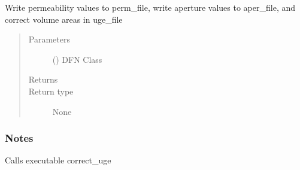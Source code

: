 \documentclass[letterpaper,10pt,english]{sphinxmanual}
\begin{document}
\begin{fulllineitems}
\label{\detokenize{pydfnworks:pydfnworks.dfnFlow.pflotran.write_perms_and_correct_volumes_areas}}
Write permeability values to perm\_file, write aperture values to aper\_file, and correct volume areas in uge\_file
\begin{quote}\begin{description}
\item[{Parameters}] \leavevmode
{} () \textendash{} DFN Class

\item[{Returns}] \leavevmode


\item[{Return type}] \leavevmode
None

\end{description}\end{quote}
\subsubsection*{Notes}

Calls executable correct\_uge

\end{fulllineitems}

\end{document}
